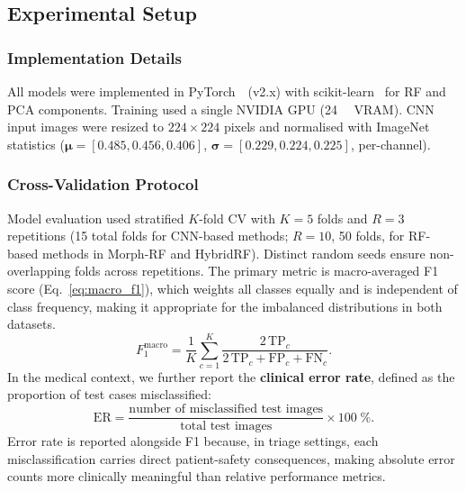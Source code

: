 \documentclass[preprint,12pt]{elsarticle}
\begin{document}
\subsection{Experimental Setup}
\label{sec:setup}

\subsubsection{Implementation Details}

All models were implemented in PyTorch~\cite{paszke2019pytorch}~(v2.x)
with scikit-learn~\cite{pedregosa2011sklearn} for RF and PCA components.
Training used a single NVIDIA GPU (\SI{24}{\giga\byte} VRAM).
CNN input images were resized to $224 \times 224$ pixels and normalised
with ImageNet statistics
($\bm{\mu} = [0.485, 0.456, 0.406]$,
$\bm{\sigma} = [0.229, 0.224, 0.225]$, per-channel).

\subsubsection{Cross-Validation Protocol}

Model evaluation used stratified $K$-fold CV with $K = 5$ folds and
$R = 3$ repetitions (15 total folds for CNN-based methods;
$R = 10$, 50 folds, for RF-based methods in Morph-RF and HybridRF).
Distinct random seeds ensure non-overlapping folds across repetitions.
The primary metric is macro-averaged F1 score (Eq.~\eqref{eq:macro_f1}),
which weights all classes equally and is independent of class frequency,
making it appropriate for the imbalanced distributions in both datasets.
\begin{equation}
  F_1^{\mathrm{macro}} = \frac{1}{K}\sum_{c=1}^K
  \frac{2\,\mathrm{TP}_c}{2\,\mathrm{TP}_c + \mathrm{FP}_c + \mathrm{FN}_c}.
  \label{eq:macro_f1}
\end{equation}
In the medical context, we further report the \textbf{clinical error
rate}, defined as the proportion of test cases misclassified:
\begin{equation}
  \mathrm{ER} = \frac{\text{number of misclassified test images}}{\text{total test images}} \times 100\;\%.
  \label{eq:error_rate}
\end{equation}
Error rate is reported alongside F1 because, in triage settings, each
misclassification carries direct patient-safety consequences, making
absolute error counts more clinically meaningful than relative
performance metrics.
\end{document}
